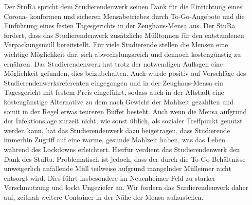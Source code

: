     {
        Der StuRa spricht dem Studierendenwerk seinen Dank für die Einrichtung eines Corona-
        konformen
        und sicheren Mensabetriebes durch To-Go-Angebote und die Einführung eines festen
        Tagesgerichts
        in der Zeughaus-Mensa aus.
        Der StuRa fordert, dass das Studierendenwerk zusätzliche Mülltonnen für den
        entstandenen
        Verpackungsmüll bereitstellt.
    }{
        Für viele Studierende stellen die Mensen eine wichtige Möglichkeit dar, sich abwechslungsreich
        und dennoch kostengünstig zu ernähren. Das Studierendenwerk hat trotz der notwendigen Auflagen
        eine Möglichkeit gefunden, dies beizubehalten. Auch wurde positiv auf Vorschläge des
        Studierendenwerksreferenten eingegangen und in der Zeughaus-Mensa ein Tagesgericht mit festem
        Preis eingeführt, sodass auch in der Altstadt eine kostengünstige Alternative zu dem nach Gewicht
        der Mahlzeit gezahlten und somit in der Regel etwas teureren Buffet besteht.
        Auch wenn die Mensa aufgrund der Infektionslage zurzeit nicht, wie sonst üblich, als sozialer
        Treffpunkt genutzt werden kann, hat das Studierendenwerk dazu beigetragen, dass Studierende
        immerhin Zugriff auf eine warme, gesunde Mahlzeit haben, was das Leben während des
        Lockdowns erleichtert. Hierfür verdient das Studierendenwerk den Dank des StuRa.
        Problematisch ist jedoch, dass der durch die To-Go-Behältnisse unweigerlich anfallende Müll
        teilweise aufgrund mangelnder Mülleimer nicht entsorgt wird. Dies führt insbesondere im 
        Neuenheimer Feld zu starker Verschmutzung und lockt Ungeziefer an. Wir fordern das
        Surdierendenwerk daher auf, zeitnah weitere Container in der Nähe der Mensa aufzustellen.
    }{
    }{
    }
